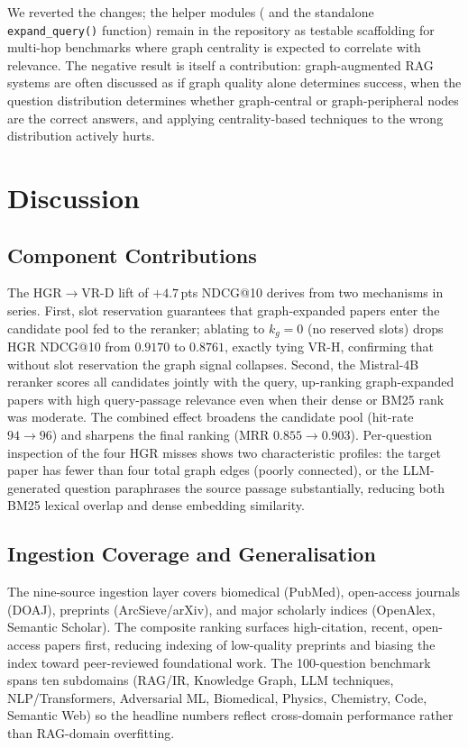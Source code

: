 \documentclass[journal]{IEEEtran}
\begin{document}
We reverted the changes; the helper modules (
and the standalone \texttt{expand\_query()} function) remain in the
repository as testable scaffolding for multi-hop benchmarks where
graph centrality is expected to correlate with relevance. The
negative result is itself a contribution: graph-augmented RAG
systems are often discussed as if graph quality alone determines
success, when the question distribution determines whether
graph-central or graph-peripheral nodes are the correct answers, and
applying centrality-based techniques to the wrong distribution
actively hurts.

\section{Discussion}
\label{sec:discussion}

\subsection{Component Contributions}
The HGR$\to$VR-D lift of $+4.7$\,pts NDCG@10 derives from two
mechanisms in series. First, slot reservation guarantees that
graph-expanded papers enter the candidate pool fed to the reranker;
ablating to $k_g=0$ (no reserved slots) drops HGR NDCG@10 from
$0.9170$ to $0.8761$, exactly tying VR-H, confirming that without
slot reservation the graph signal collapses. Second, the
Mistral-4B reranker scores all candidates jointly with the query,
up-ranking graph-expanded papers with high query-passage relevance
even when their dense or BM25 rank was moderate. The combined
effect broadens the candidate pool (hit-rate $94 \to 96$) and
sharpens the final ranking (MRR $0.855 \to 0.903$). Per-question
inspection of the four HGR misses shows two characteristic profiles:
the target paper has fewer than four total graph edges (poorly
connected), or the LLM-generated question paraphrases the source
passage substantially, reducing both BM25 lexical overlap and dense
embedding similarity.

\subsection{Ingestion Coverage and Generalisation}
The nine-source ingestion layer covers biomedical (PubMed),
open-access journals (DOAJ), preprints (ArcSieve/arXiv), and major
scholarly indices (OpenAlex, Semantic Scholar). The composite
ranking surfaces high-citation, recent, open-access papers first,
reducing indexing of low-quality preprints and biasing the index
toward peer-reviewed foundational work. The 100-question benchmark
spans ten subdomains (RAG/IR, Knowledge Graph, LLM techniques,
NLP/Transformers, Adversarial ML, Biomedical, Physics, Chemistry,
Code, Semantic Web) so the headline numbers reflect cross-domain
performance rather than RAG-domain overfitting.
\end{document}
